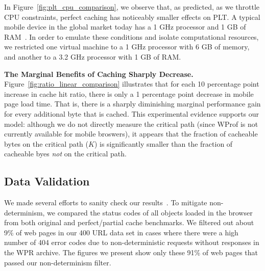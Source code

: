 In Figure~\ref{fig:plt_cpu_comparison}, we observe that, as predicted,
as we throttle CPU constraints, perfect caching has noticeably smaller effects on PLT. %
A typical mobile device in the global market today has a 1 GHz processor and 1 GB of RAM~\cite{mobile-stats}. In order to emulate these conditions and isolate computational resources, we restricted one virtual machine to a 1 GHz processor with 6 GB of memory, and another to a 3.2 GHz processor with 1 GB of RAM.

{\bf The Marginal Benefits of Caching Sharply Decrease.}
Figure~\ref{fig:ratio_linear_comparison} illustrates that for each 10 percentage point increase in cache hit ratio, there is only
a 1 percentage point decrease in mobile page load time.
That is, there is a sharply diminishing marginal performance gain for 
every additional byte that is cached.
This experimental evidence supports our model:
although we do not directly measure the critical path (since WProf is not currently available for mobile broswers), it appears that the fraction of cacheable bytes on the critical path ($K$) is
significantly smaller than the fraction of cacheable byes {\it not} on
the critical path.

% 


\subsection{Data Validation}
\label{subsec:validation}
We made several efforts to sanity check our results~\cite{sanity-checks}. To
mitigate non-determinism, we compared the status codes of all objects loaded
in the browser from both original and perfect/partial cache benchmarks. We
filtered out about 9\% of web pages in our 400 URL data set in cases where
there were a high number of 404 error codes due to non-deterministic requests
without responses in the WPR archive. The figures we present show only these
91\% of web pages that passed our non-determinism filter.

